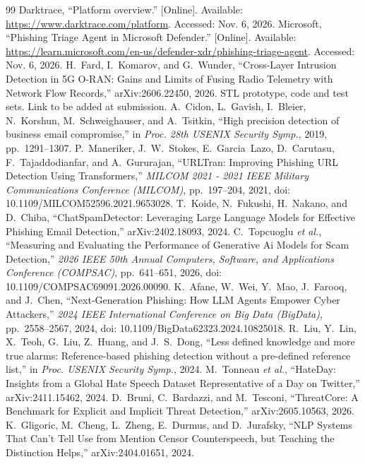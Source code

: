 \begin{thebibliography}{99}
 Darktrace, ``Platform overview.'' [Online]. Available: \url{https://www.darktrace.com/platform}. Accessed: Nov. 6, 2026.
 Microsoft, ``Phishing Triage Agent in Microsoft Defender.'' [Online]. Available: \url{https://learn.microsoft.com/en-us/defender-xdr/phishing-triage-agent}. Accessed: Nov. 6, 2026.
 H.~Fard, I.~Komarov, and G.~Wunder, ``Cross-Layer Intrusion Detection in 5G O-RAN: Gains and Limits of Fusing Radio Telemetry with Network Flow Records,'' arXiv:2606.22450, 2026.
 STL prototype, code and test sets. Link to be added at submission.
 A.~Cidon, L.~Gavish, I.~Bleier, N.~Korshun, M.~Schweighauser, and A.~Tsitkin, ``High precision detection of business email compromise,'' in \emph{Proc. 28th USENIX Security Symp.}, 2019, pp.~1291--1307.
 P.~Maneriker, J.~W.~Stokes, E.~Garcia~Lazo, D.~Carutasu, F.~Tajaddodianfar, and A.~Gururajan, ``URLTran: Improving Phishing URL Detection Using Transformers,'' \emph{MILCOM 2021 - 2021 IEEE Military Communications Conference (MILCOM)}, pp.~197--204, 2021, doi: 10.1109/MILCOM52596.2021.9653028.
 T.~Koide, N.~Fukushi, H.~Nakano, and D.~Chiba, ``ChatSpamDetector: Leveraging Large Language Models for Effective Phishing Email Detection,'' arXiv:2402.18093, 2024.
 C.~Topcuoglu \emph{et al.}, ``Measuring and Evaluating the Performance of Generative Ai Models for Scam Detection,'' \emph{2026 IEEE 50th Annual Computers, Software, and Applications Conference (COMPSAC)}, pp.~641--651, 2026, doi: 10.1109/COMPSAC69091.2026.00090.
 K.~Afane, W.~Wei, Y.~Mao, J.~Farooq, and J.~Chen, ``Next-Generation Phishing: How LLM Agents Empower Cyber Attackers,'' \emph{2024 IEEE International Conference on Big Data (BigData)}, pp.~2558--2567, 2024, doi: 10.1109/BigData62323.2024.10825018.
 R.~Liu, Y.~Lin, X.~Teoh, G.~Liu, Z.~Huang, and J.~S.~Dong, ``Less defined knowledge and more true alarms: Reference-based phishing detection without a pre-defined reference list,'' in \emph{Proc. USENIX Security Symp.}, 2024.
 M.~Tonneau \emph{et al.}, ``HateDay: Insights from a Global Hate Speech Dataset Representative of a Day on Twitter,'' arXiv:2411.15462, 2024.
 D.~Bruni, C.~Bardazzi, and M.~Tesconi, ``ThreatCore: A Benchmark for Explicit and Implicit Threat Detection,'' arXiv:2605.10563, 2026.
 K.~Gligoric, M.~Cheng, L.~Zheng, E.~Durmus, and D.~Jurafsky, ``NLP Systems That Can't Tell Use from Mention Censor Counterspeech, but Teaching the Distinction Helps,'' arXiv:2404.01651, 2024.

\end{thebibliography}
